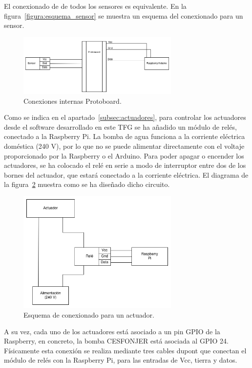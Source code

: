 \documentclass[a4paper, 12pt, oneside]{book}
\begin{document}
El conexionado de de todos los sensores es equivalente. En la figura~\ref{figura:esquema_sensor} se muestra un esquema del conexionado para un sensor.
\begin{figure}[H]
	\centering
    \includegraphics[width=8cm, keepaspectratio]{img/conexion_sensor}
    \caption{Conexiones internas Protoboard.}
    \label{figura:conexion_sensor}
\end{figure}


Como se indica en el apartado~\ref{subsec:actuadores}, para controlar los actuadores desde el software desarrollado en este TFG se ha añadido un módulo de relés, conectado a la Raspberry Pi. La bomba de agua funciona a la corriente eléctrica doméstica (240 V), por lo que no se puede alimentar directamente con el voltaje proporcionado por la Raspberry o el Arduino. Para poder apagar o encender los actuadores, se ha colocado el relé en serie a modo de interruptor entre dos de los bornes del actuador, que estará conectado a la corriente eléctrica.
El diagrama de la figura~\ref{figura:circuito_reles} muestra como se ha diseñado dicho circuito.

\begin{figure}[H]
	\centering
    \includegraphics[width=8cm, keepaspectratio]{img/circuito_reles}
    \caption{Esquema de conexionado para un actuador.}
    \label{figura:circuito_reles}
\end{figure}

A su vez, cada uno de los actuadores está asociado a un pin GPIO de la Raspberry, en concreto, la bomba CESFONJER está asociada al GPIO 24. Físicamente esta conexión se realiza mediante tres cables dupont que conectan el módulo de relés con la Raspberry Pi, para las entradas de Vcc, tierra y datos.
\end{document}
